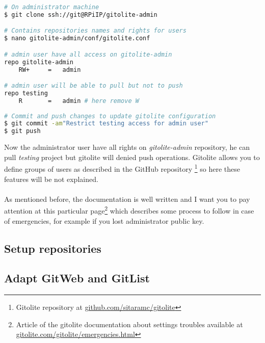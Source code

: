 \begin{lstlisting}[language=bash,caption=Gitolite administration]
# On administrator machine
$ git clone ssh://git@RPiIP/gitolite-admin

# Contains repositories names and rights for users
$ nano gitolite-admin/conf/gitolite.conf

# admin user have all access on gitolite-admin
repo gitolite-admin
    RW+     =   admin

# admin user will be able to pull but not to push
repo testing
    R       =   admin # here remove W
    
# Commit and push changes to update gitolite configuration
$ git commit -am"Restrict testing access for admin user"
$ git push
\end{lstlisting}

Now the administrator user have all rights on \emph{gitolite-admin} repository, he
can pull \emph{testing} project but gitolite will denied push operations. Gitolite 
allows you to define groups of users as described in the GitHub repository
\footnote{Gitolite repository at \href{https://github.com/sitaramc/gitolite}
{github.com/sitaramc/gitolite}} so here these features will be not explained.
\\\\
As mentioned before, the documentation is well written and I want you to pay 
attention at this particular page\footnote{Article of the gitolite documentation 
about settings troubles available at \href{http://gitolite.com/gitolite/emergencies.html}
{gitolite.com/gitolite/emergencies.html}} which describes some process to follow 
in case of emergencies, for example if you lost administrator public key.

\subsection{Setup repositories}
\subsection{Adapt GitWeb and GitList}

